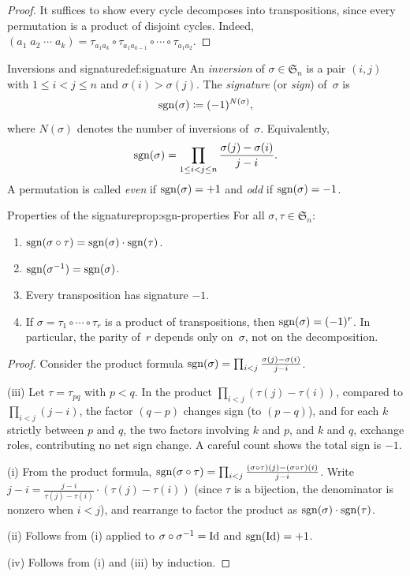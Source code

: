 \begin{proof}
It suffices to show every cycle decomposes into transpositions, since
every permutation is a product of disjoint cycles. Indeed,
$(a_1\;a_2\;\cdots\;a_k) = \tau_{a_1 a_k}\circ\tau_{a_1 a_{k-1}}
\circ\cdots\circ\tau_{a_1 a_2}$.
\end{proof}

\begin{definition}{Inversions and signature}{def:signature}
An \emph{inversion} of $\sigma\in\mathfrak{S}_n$ is a pair $(i,j)$
with $1\leq i < j \leq n$ and $\sigma(i)>\sigma(j)$.
The \emph{signature} (or \emph{sign}) of~$\sigma$ is
\[
  \operatorname{sgn}(\sigma) \coloneqq (-1)^{N(\sigma)},
\]
where $N(\sigma)$ denotes the number of inversions of~$\sigma$.
Equivalently,
\[
  \operatorname{sgn}(\sigma) = \prod_{1\leq i < j \leq n}
    \frac{\sigma(j)-\sigma(i)}{j-i}.
\]
A permutation is called \emph{even} if
$\operatorname{sgn}(\sigma)=+1$ and \emph{odd} if
$\operatorname{sgn}(\sigma)=-1$.
\end{definition}

\begin{proposition}{Properties of the signature}{prop:sgn-properties}
For all $\sigma,\tau\in\mathfrak{S}_n$:
\begin{enumerate}[label=(\roman*)]
  \item $\operatorname{sgn}(\sigma\circ\tau) = \operatorname{sgn}(\sigma)\cdot\operatorname{sgn}(\tau)$.
  \item $\operatorname{sgn}(\sigma^{-1}) = \operatorname{sgn}(\sigma)$.
  \item Every transposition has signature $-1$.
  \item If $\sigma = \tau_1\circ\cdots\circ\tau_r$ is a product of
    transpositions, then $\operatorname{sgn}(\sigma)=(-1)^r$. In particular, the
    parity of~$r$ depends only on~$\sigma$, not on the decomposition.
\end{enumerate}
\end{proposition}

\begin{proof}
Consider the product formula
$\operatorname{sgn}(\sigma) = \prod_{i<j}\frac{\sigma(j)-\sigma(i)}{j-i}$.

(iii) Let $\tau = \tau_{pq}$ with $p < q$. In the product
$\prod_{i<j}(\tau(j)-\tau(i))$, compared to $\prod_{i<j}(j-i)$,
the factor $(q-p)$ changes sign (to $(p-q)$), and for each $k$
strictly between $p$ and $q$, the two factors involving $k$ and $p$,
and $k$ and $q$, exchange roles, contributing no net sign change.
A careful count shows the total sign is $-1$.

(i) From the product formula,
$\operatorname{sgn}(\sigma\circ\tau) = \prod_{i<j}
\frac{(\sigma\circ\tau)(j)-(\sigma\circ\tau)(i)}{j-i}$.
Write $j-i = \frac{j-i}{\tau(j)-\tau(i)}\cdot(\tau(j)-\tau(i))$
(since $\tau$ is a bijection, the denominator is nonzero when $i<j$),
and rearrange to factor the product as $\operatorname{sgn}(\sigma)\cdot\operatorname{sgn}(\tau)$.

(ii) Follows from (i) applied to $\sigma\circ\sigma^{-1}=\operatorname{Id}$
and $\operatorname{sgn}(\operatorname{Id})=+1$.

(iv) Follows from (i) and (iii) by induction.
\end{proof}

